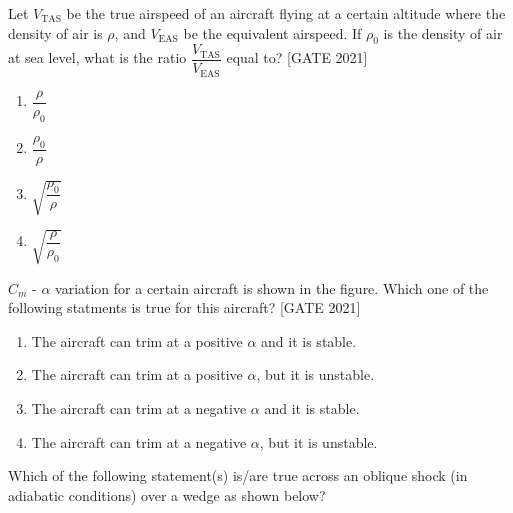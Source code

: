 \item Let $V_{\text{TAS}}$ be the true airspeed of an aircraft flying at a certain altitude where the density of air is $\rho$, and $V_{\text{EAS}}$ be the equivalent airspeed. If $\rho_0$ is the density of air at sea level, what is the ratio $ \dfrac{V_{\text{TAS}}}{V_{\text{EAS}}}$ equal to?
 \hfill{[GATE 2021]}\begin{multicols}{4}\begin{enumerate}
    \item $ \dfrac{\rho}{\rho_0}$
    \item $ \dfrac{\rho_0}{\rho}$
    \item $\sqrt{ \dfrac{\rho_0}{\rho}}$
    \item $\sqrt{ \dfrac{\rho}{\rho_0}}$
\end{enumerate}
\end{multicols}
\item $C_{m}$ - $\alpha$ variation for a certain aircraft is shown in the figure. Which one of the following statments is true for this aircraft?
 \hfill{[GATE 2021]}
\begin{centering}
%

\end{centering}
 \begin{enumerate}
\item The aircraft can trim at a positive $\alpha$ and it is stable. 
\item The aircraft can trim at a positive $\alpha$, but it is unstable.

\item The aircraft can trim at a negative $\alpha$ and it is stable.

\item The aircraft can trim at a negative $\alpha$, but it is unstable.
\end{enumerate}
\item Which of the following statement(s) is/are true across an oblique shock (in adiabatic conditions) over a wedge as shown below?

